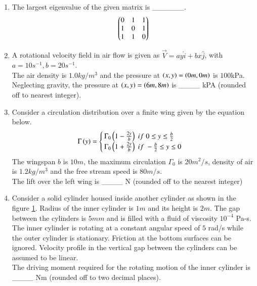 \documentclass[journal]{IEEEtran}
\begin{document}
\begin{enumerate}
        \item The largest eigenvalue of the given matrix is \_\_\_\_\_\_.
            \begin{align*}
                \begin{pmatrix}0&1&1\\1&0&1\\1&1&0\end{pmatrix}
            \end{align*}

        \item A rotational velocity field in air flow is given as $\overrightarrow{V} = ay\hat{i} + bx\hat{j}$, with $a=10 s^{-1},b=20 s^{-1}$.\\The air density is $1.0 kg/m^3$ and the pressure at $\left(x,y\right) = \left(0m, 0m\right)$ is $100$kPa.\\Neglecting gravity, the pressure at $\left(x,y\right) = \left(6m,8m\right)$ is \_\_\_\_ kPA (rounded off to nearest integer).

        \item Consider a circulation distribution over a finite wing given by the equation below.
            \begin{align*}
                \Gamma \left(y\right) = 
                \begin{cases}
                    \Gamma _ 0 \left(1 - \frac{2y}{b}\right) \; if \; 0 \leq y \leq \frac{b}{2}\\
                    \Gamma _ 0 \left(1 + \frac{2y}{b}\right) \; if \; -\frac{b}{2} \leq y \leq 0\\
                \end{cases}
            \end{align*}
            The wingspan $b$ is $10m$, the maximum circulation $\Gamma _ 0$ is $20 m^2/s$, density of air is $1.2 kg/m^3$ and the free stream speed is $80 m/s$.\\The lift over the left wing is \_\_\_\_ N (rounded off to the nearest integer)

    \item Consider a solid cylinder housed inside another cylinder as shown in the figure \ref{52fig}. Radius of the inner cylinder is $1 m$ and its height is $2 m$. The gap between the cylinders is $5 mm$ and is filled with a fluid of viscosity $10^{-4}$ Pa-s.\\The inner cylinder is rotating at a constant angular speed of $5$ rad/s while the outer cylinder is stationary. Friction at the bottom surfaces can be ignored. Velocity profile in the vertical gap between the cylinders can be assumed to be linear.\\ The driving moment required for the rotating motion of the inner cylinder is \_\_\_\_ Nm (rounded off to two decimal places).
    \begin{figure}[H]
        \centering
        
        \caption{}
        \label{52fig}
    \end{figure}
        \end{enumerate}


  
\end{document}
